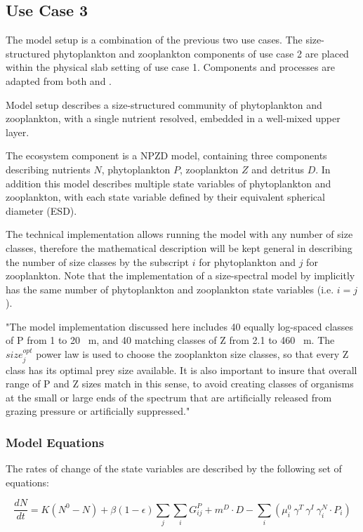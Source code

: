 \documentclass[template.tex]{subfiles}
\begin{document}
\subsection{Use Case 3}
The model setup is a combination of the previous two use cases. The size-structured phytoplankton and zooplankton components of use case 2 are placed within the physical slab setting of use case 1. Components and processes are adapted from both \citet{Banas2011b} and \citet{Anderson2015c}.

Model setup describes a size-structured community of phytoplankton and zooplankton, with a single nutrient resolved, embedded in a well-mixed upper layer.

The ecosystem component is a NPZD model, containing three components describing nutrients $N$, phytoplankton $P$, zooplankton $Z$ and detritus $D$. In addition this model describes multiple state variables of phytoplankton and zooplankton, with each state variable defined by their equivalent spherical diameter (ESD).

The technical implementation allows running the model with any number of size classes, therefore the mathematical description will be kept general in describing the number of size classes by the subscript $i$ for phytoplankton and $j$ for zooplankton. Note that the implementation of a size-spectral model by \citeauthor{Banas2011b} implicitly has the same number of phytoplankton and zooplankton state variables (i.e. $i = j$).

"The model implementation discussed here includes 40 equally log-spaced classes of P from 1 to 20 \unit{\mu m}, and 40 matching classes of Z from 2.1 to 460 \unit{\mu m}. The $size^{opt}_j$ power law is used to choose the zooplankton size classes, so that every Z class has its optimal prey size available. It is also important to insure that overall range of P and Z sizes match in this sense, to avoid creating classes of organisms at the small or large ends of the spectrum that are artificially released from grazing pressure or artificially suppressed."


\subsubsection{Model Equations}
The rates of change of the state variables are described by the following set of equations:


\begin{equation}
    \frac{d N}{d t} = 
    K (N^0 - N) %
    +  \beta(1 - \epsilon)\sum_{j} \sum_{i} G_{ij}^P %
    +  m^D \cdot D %
    - \sum_{i} ( \mu_i^{0} \  \gamma^{T} \ \gamma^{I} \ \gamma_i^N \cdot P_i) %
\end{equation}
\end{document}
